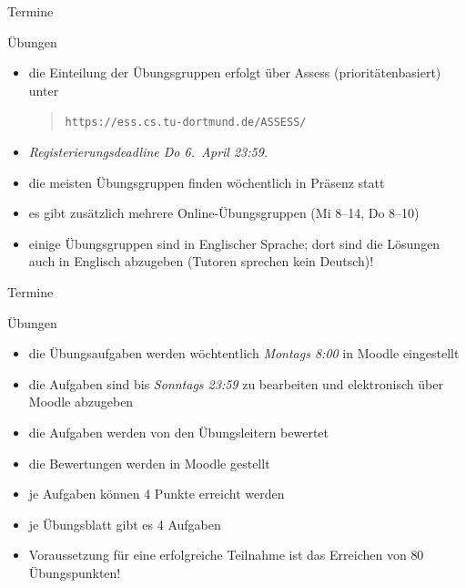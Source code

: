 \documentclass[aspectratio=1610, 11pt]{beamer}
\begin{document}
%
%
%

\begin{frame}{Termine}
	\begin{exampleblock}{\"Ubungen}
		\begin{itemize}
			\item die Einteilung der \"Ubungsgruppen erfolgt \"uber Assess (priorit\"atenbasiert) unter
				\begin{quote}
\tt https://ess.cs.tu-dortmund.de/ASSESS/
				\end{quote}
			\item \emph{Registerierungsdeadline Do 6.~April 23:59.}
			\item die meisten \"Ubungsgruppen finden w\"ochentlich \alert{in Pr\"asenz} statt
			\item es gibt zus\"atzlich mehrere \alert{Online-\"Ubungsgruppen} (Mi 8--14, Do 8--10)
			\item einige \"Ubungsgruppen sind in \alert{Englischer Sprache}; dort sind die L\"osungen auch in Englisch abzugeben (Tutoren sprechen kein Deutsch)!
		\end{itemize}
	\end{exampleblock}
\end{frame}

\begin{frame}{Termine}
	\begin{exampleblock}{\"Ubungen}
		\begin{itemize}
			\item die \"Ubungsaufgaben werden w\"ochtentlich \emph{Montags 8:00} in Moodle eingestellt
			\item die Aufgaben sind bis \emph{Sonntags 23:59} zu bearbeiten und elektronisch \"uber Moodle abzugeben
			\item die Aufgaben werden von den \"Ubungsleitern bewertet
			\item die Bewertungen werden in Moodle gestellt
			\item je Aufgaben k\"onnen 4 Punkte erreicht werden
			\item je \"Ubungsblatt gibt es 4 Aufgaben
			\item Voraussetzung f\"ur eine erfolgreiche Teilnahme ist das Erreichen von \alert{80 \"Ubungspunkten!}
		\end{itemize}
	\end{exampleblock}
\end{frame}
\end{document}
